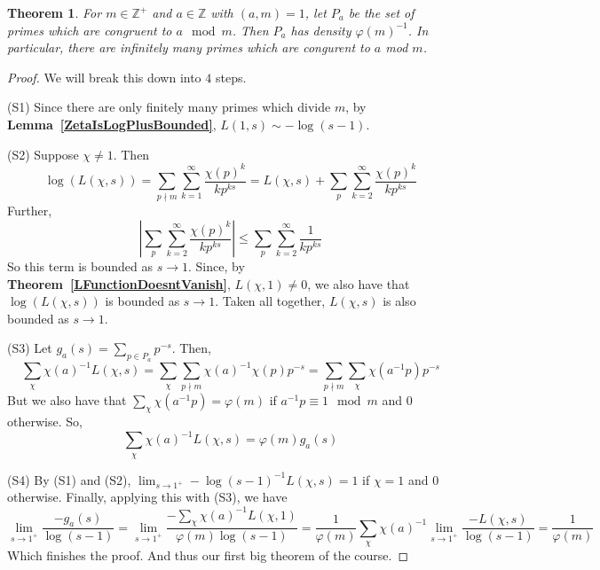 \documentclass[12pt]{article}
\newcommand{\ints}{\mathbb{Z}}
\newcommand{\lref}[1]{\textbf{Lemma~\ref{#1}}}
\newcommand{\tref}[1]{\textbf{Theorem~\ref{#1}}}
\newtheorem{thm}{Theorem}
\numberwithin{equation}{section}
\numberwithin{thm}{section}
\numberwithin{lemma}{section}
\numberwithin{cor}{section}
\begin{document}
\begin{thm}\label{DirichletsTheorem}
  For $m \in \ints^+$ and $a \in \ints$ with $(a, m) = 1$, let $P_a$ be the set of primes which are congruent to $a \mod m$. Then $P_a$ has density $\varphi(m)^{-1}$. In particular, there are infinitely many primes which are congurent to $a$ mod $m$.
\end{thm}
\begin{proof}
  We will break this down into $4$ steps.

  (S1) Since there are only finitely many primes which divide $m$, by \lref{ZetaIsLogPlusBounded}, $L(1, s) \sim -\log(s-1)$.

  (S2) Suppose $\chi \ne 1$. Then \begin{equation*}
    \log (L(\chi, s)) = \sum_{p \nmid m} \sum_{k = 1}^{\infty} \frac{\chi(p)^k}{kp^{ks}} = L(\chi, s) + \sum_p \sum_{k = 2}^{\infty} \frac{\chi(p)^k}{kp^{ks}}
  \end{equation*} Further, \begin{equation*}
    \left| \sum_p \sum_{k=2}^{\infty} \frac{\chi(p)^k}{kp^{ks}} \right| \leq \sum_{p} \sum_{k=2}^{\infty} \frac{1}{kp^{ks}}
  \end{equation*} So this term is bounded as $s \to 1$. Since, by \tref{LFunctionDoesntVanish}, $L(\chi, 1) \ne 0$, we also have that $\log (L(\chi, s))$ is bounded as $s \to 1$. Taken all together, $L(\chi, s)$ is also bounded as $s \to 1$.

  (S3) Let $g_a(s) = \sum_{p \in P_a} p^{-s}$. Then, \begin{equation*}
    \sum_{\chi} \chi(a)^{-1} L(\chi, s) = \sum_{\chi} \sum_{p \nmid m} \chi(a)^{-1} \chi(p) p^{-s} = \sum_{p \nmid m} \sum_{\chi} \chi(a^{-1}p) p^{-s}
  \end{equation*}
  But we also have that $\sum_{\chi} \chi(a^{-1}p) = \varphi(m)$ if $a^{-1}p \equiv 1 \mod m$ and $0$ otherwise. So, \begin{equation*}
    \sum_{\chi} \chi(a)^{-1} L(\chi, s) = \varphi(m) g_a(s)
  \end{equation*}

  (S4) By (S1) and (S2), $\lim_{s \to 1^+} -\log(s-1)^{-1} L(\chi, s) = 1$ if $\chi = 1$ and $0$ otherwise. Finally, applying this with (S3), we have \begin{equation*}
    \lim_{s \to 1^+} \frac{-g_a(s)}{\log(s-1)} = \lim_{s \to 1^+} \frac{-\sum_{\chi} \chi(a)^{-1} L(\chi, 1)}{\varphi(m) \log(s-1)} = \frac{1}{\varphi(m)} \sum_{\chi} \chi(a)^{-1} \lim_{s \to 1^+} \frac{-L(\chi, s)}{\log(s-1)} = \frac{1}{\varphi(m)}
  \end{equation*} Which finishes the proof. And thus our first big theorem of the course.
\end{proof}
\end{document}
